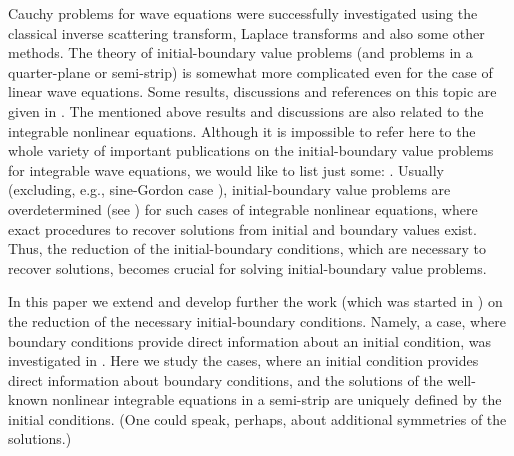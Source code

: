 \documentclass[pdftex]{sigma}
\numberwithin{equation}{section}
\begin{document}
Cauchy problems for wave equations were successfully investigated
using the classical inverse scattering transform, Laplace transforms and also
some other methods.
The theory of initial-boundary value problems (and problems in a quarter-plane
or semi-strip) is somewhat more complicated even for the case of linear wave equations.
Some results, discussions and references on this topic are given
 in \cite{Ash, DeMaS, FoP, GMZ, Krei, SaAF}. The mentioned above results
and discussions are also related to the integrable nonlinear equations.
Although it is impossible to refer here to the whole variety of important publications on the
initial-boundary value problems for integrable wave equations, we would like
to list just some: \cite{BiTa, BW83, CB, DeMaS, Fok, FoP, Holm, KamS, Ka, KaNe, KaSt, Kri, Sab1, Sab3, SaA7, SaSaR, SaL91, Skl}.
Usually (excluding, e.g., sine-Gordon case \cite{KaNe, Kri, SaAg, SaSaR}),
initial-boundary value problems are overdetermined (see \cite{BoFo, Fok, SaSaR}) for such cases of integrable nonlinear equations, where
exact procedures to recover solutions from initial and boundary values exist.
Thus, the reduction of the initial-boundary conditions, which are necessary to recover solutions, becomes crucial for
solving initial-boundary value problems.

In this paper we extend and develop further the work (which was started in \cite{Sa14b}) on the reduction
of the necessary initial-boundary conditions. Namely, a case, where boundary conditions provide direct information about an initial condition,
was investigated in \cite{Sa14b}.
Here we study the cases, where an initial condition provides direct information about boundary conditions,
and the solutions of the well-known nonlinear integrable equations in a semi-strip are uniquely def\/ined by the
initial conditions. (One could speak, perhaps, about additional symmetries of the solutions.)
\end{document}
